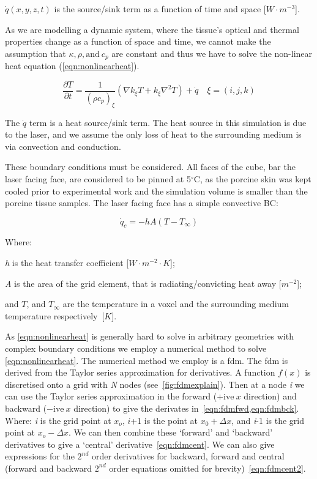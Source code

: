 	\indent $\dot{q}(x,y,z,t)$ is the source/sink term as a function of time and space [$W\cdot m^{-3}$].
	
	\medskip

As we are modelling a dynamic system, where the tissue's optical and thermal properties change as a function of space and time, we cannot make the assumption that $\kappa, \rho, \text{and}\  c_p$ are constant and thus we have to solve the non-linear heat equation (\cref{eqn:nonlinearheat}).

\begin{equation}
\frac{\partial T}{\partial t} = \frac{1}{(\rho c_p)_{\xi}}(\nabla k_\xi T + k_\xi\nabla^2T)+\dot{q}\quad \xi=(i,j,k)
\label{eqn:nonlinearheat}
\end{equation}

The $\dot{q}$ term is a heat source/sink term. The heat source in this simulation is due to the laser, and we assume the only loss of heat to the surrounding medium is via convection and conduction.
	
These boundary conditions must be considered. All faces of the cube, bar the laser facing face, are considered to be pinned at 5$^{\circ}$C, as the porcine skin was kept cooled prior to experimental work and the simulation volume is smaller than the porcine tissue samples. The laser facing face has a simple convective BC:	

\begin{equation}
\dot{q}_c = -hA(T - T_\infty)
\label{eqn:bceqns}
\end{equation}

\noindent Where:

	\indent \textit{h} is the heat transfer coefficient [$W\cdot m^{-2}\cdot K$];
	
	\indent \textit{A} is the area of the grid element, that is radiating/convicting heat away [$m^{-2}$];
	
	\indent and $T$, and $T_\infty$ are the temperature in a voxel and the surrounding medium temperature respectively~[$K$].
	
	\medskip

As \cref{eqn:nonlinearheat} is generally hard to solve in arbitrary geometries with complex boundary conditions we employ a numerical method to solve \cref{eqn:nonlinearheat}.
The numerical method we employ is a \gls{fdm}. The \gls{fdm} is derived from the Taylor series approximation for derivatives. A function $f(x)$ is discretised onto a grid with \textit{N} nodes (see~\cref{fig:fdmexplain}). Then at a node \textit{i} we can use the Taylor series approximation in the forward ($+\text{ive}\ x$ direction) and backward ($-\text{ive}\ x$ direction) to give the derivates in~\cref{eqn:fdmfwd,eqn:fdmbck}. Where: \textit{i} is the grid point at $x_o$, $i$+1 is the point at $x_0+\Delta x$, and \textit{i}-1 is the grid point at $x_{o}-\Delta x$. We can then combine these `forward' and `backward' derivatives to give a `central' derivative~\cref{eqn:fdmcent}. We can also give expressions for the $2^{nd}$ order derivatives for backward, forward and central (forward and backward $2^{nd}$ order equations omitted for brevity)~\cref{eqn:fdmcent2}.

